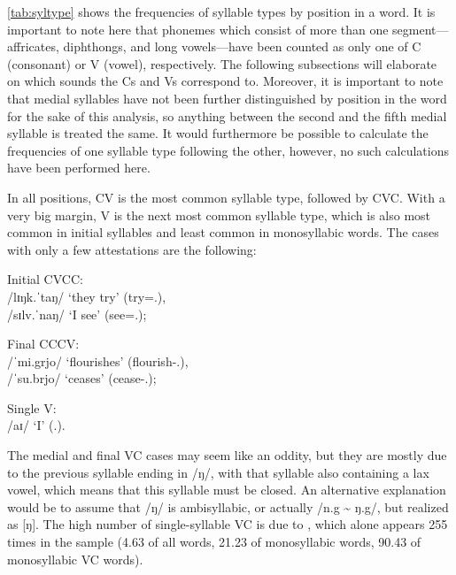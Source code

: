 \autoref{tab:syltype} shows the frequencies of syllable types by position in a 
word. It is important to note here that phonemes which consist of more than one 
segment---affricates, diphthongs, and long vowels---have been counted as only 
one of C (consonant) or V (vowel), respectively. The following subsections will 
elaborate on which sounds the Cs and Vs correspond to. Moreover, it is important 
to note that medial syllables have not been further distinguished by position in 
the word for the sake of this analysis, so anything between the second and the 
fifth medial syllable is treated the same. It would furthermore be possible to 
calculate the frequencies of one syllable type following the other, 
however, no such calculations have been performed here.

In all positions, CV is the most common syllable type, followed by CVC. With a 
very big margin, V is the next most common syllable type, which is also most 
common in initial syllables and least common in monosyllabic words. The cases 
with only a few attestations are the following:

\pex
	\a Initial CVCC:\\
		 /lɪŋk.ˈtaŋ/ `they try' (try=\TplM{}.\Aarg{}),\footnotemark\\
		 /sɪlv.ˈnaŋ/ `I see' (see=\Fpl{}.\Aarg{});
		
	\a Final CCCV:\\
		 /ˈmi.grjo/ `flourishes' (flourish-\Tsg{}.\N{}),\\
		 /ˈsu.brjo/ `ceases' (cease-\Tsg{}.\N{});
	
	\a Single V:\\
		 /aɪ/ `I' (\Fsg{}.\Top{}).
\xe
{}

The medial and final VC cases may seem like an oddity, but they are mostly due 
to the previous syllable ending in /ŋ/, with that syllable also containing a 
lax vowel, which means that this syllable must be closed. An alternative 
explanation would be to assume that /ŋ/ is ambisyllabic, or actually /n.g 
\textasciitilde{} ŋ.g/, but realized as [ŋ].\label{ŋ} The high number of 
single-syllable VC is due to , which alone appears 255 
times in the sample (4.63\pct{} of all words, 21.23\pct{} of monosyllabic 
words, 90.43\pct{} of monosyllabic VC words).

